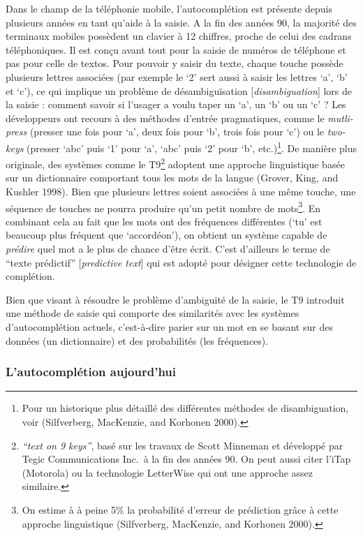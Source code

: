 \documentclass[]{article}
\begin{document}
Dans le champ de la téléphonie mobile, l'autocomplétion est présente
depuis plusieurs années en tant qu'aide à la saisie. A la fin des années
90, la majorité des terminaux mobiles possèdent un clavier à 12
chiffres, proche de celui des cadrans téléphoniques. Il est conçu avant
tout pour la saisie de numéros de téléphone et pas pour celle de textos.
Pour pouvoir y saisir du texte, chaque touche possède plusieurs lettres
associées (par exemple le `2' sert aussi à saisir les lettres `a', `b'
et `c'), ce qui implique un problème de désambiguïsation
{[}\emph{disambiguation}{]} lors de la saisie : comment savoir si
l'usager a voulu taper un `a', un `b' ou un `c' ? Les développeurs ont
recours à des méthodes d'entrée pragmatiques, comme le
\emph{mutli-press} (presser une fois pour `a', deux fois pour `b', trois
fois pour `c') ou le \emph{two-keys} (presser `abc' puis `1' pour `a',
`abc' puis `2' pour `b', etc.)\footnote{Pour un historique plus détaillé
  des différentes méthodes de disambiguation, voir (Silfverberg,
  MacKenzie, and Korhonen 2000).}. De manière plus originale, des
systèmes comme le T9\footnote{\emph{``text on 9 keys''}, basé sur les
  travaux de Scott Minneman et développé par Tegic Communications Inc.~à
  la fin des années 90. On peut aussi citer l'iTap (Motorola) ou la
  technologie LetterWise qui ont une approche assez similaire.} adoptent
une approche linguistique basée sur un dictionnaire comportant tous les
mots de la langue (Grover, King, and Kushler 1998). Bien que plusieurs
lettres soient associées à une même touche, une séquence de touches ne
pourra produire qu'un petit nombre de mots\footnote{On estime à à peine
  5\% la probabilité d'erreur de prédiction grâce à cette approche
  linguistique (Silfverberg, MacKenzie, and Korhonen 2000).}. En
combinant cela au fait que les mots ont des fréquences différentes (`tu'
est beaucoup plus fréquent que `accordéon'), on obtient un système
capable de \emph{prédire} quel mot a le plus de chance d'être écrit.
C'est d'ailleurs le terme de ``texte prédictif'' {[}\emph{predictive
text}{]} qui est adopté pour désigner cette technologie de complétion.

Bien que visant à résoudre le problème d'ambiguïté de la saisie, le T9
introduit une méthode de saisie qui comporte des similarités avec les
systèmes d'autocomplétion actuels, c'est-à-dire parier sur un mot en se
basant sur des données (un dictionnaire) et des probabilités (les
fréquences).

\hypertarget{lautocompluxe9tion-aujourdhui}{%
\subsubsection{L'autocomplétion
aujourd'hui}\label{lautocompluxe9tion-aujourdhui}}
\end{document}
